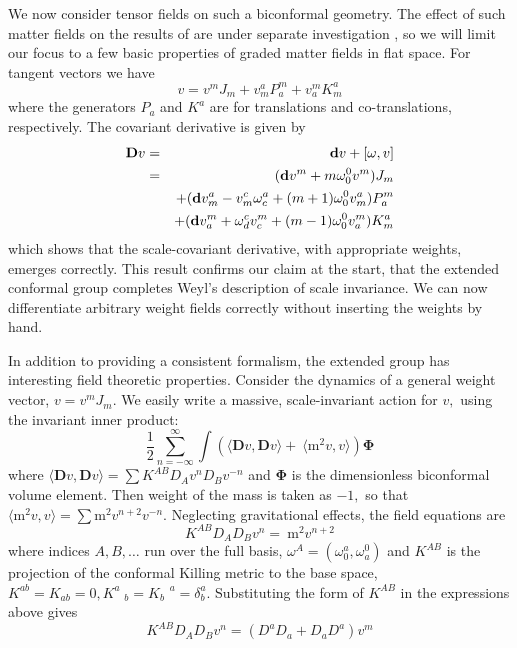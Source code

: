 \documentclass[a4paper,12pt]{article}
\begin{document}
We now consider tensor fields on such a biconformal geometry. The effect of
such matter fields on the results of \cite{WWI} are under separate
investigation \cite{WWIII}, so we will limit our focus to a few basic
properties of graded matter fields in flat space. For tangent vectors we
have 
\begin{equation}
v=v^{m}J_{m}+v_{m}^{a}P_{a}^{m}+v_{a}^{m}K_{m}^{a}
\end{equation}
where the generators $P_{a}$ and $K^{a}$ are for translations and
co-translations, respectively. The covariant derivative is given by 
\begin{eqnarray}
\mathbf{D}v &=&\mathbf{d}v+[\mathbf{\omega },v] \\
&=&(\mathbf{d}v^{m}+m\mathbf{\omega }_{0}^{0}v^{m})J_{m} \\
&&+(\mathbf{d}v_{m}^{a}-v_{m}^{c}\mathbf{\omega }_{c}^{a}+(m+1)\mathbf{%
\omega }_{0}^{0}v_{m}^{a})P_{a}^{m} \\
&&+(\mathbf{d}v_{a}^{m}+\mathbf{\omega }_{d}^{c}v_{c}^{m}+(m-1)\mathbf{%
\omega }_{0}^{0}v_{a}^{m})K_{m}^{a}
\end{eqnarray}
which shows that the scale-covariant derivative, with appropriate weights,
emerges correctly. This result confirms our claim at the start, that the
extended conformal group completes Weyl's description of scale invariance.
We can now differentiate arbitrary weight fields correctly without inserting
the weights by hand.

In addition to providing a consistent formalism, the extended group has interesting field theoretic properties. Consider the dynamics of a general weight vector, $v=v^{m}J_{m}.$ We easily write a massive, scale-invariant action for $v,$ using the invariant inner product: 
\begin{equation}
\frac{1}{2}\sum_{n=-\infty }^{\infty }\int (\langle \mathbf{D}v,\mathbf{D}%
v\rangle +\ \langle \mathrm{m}^{2}v,v\rangle )\mathbf{\Phi }
\end{equation}
where $\langle \mathbf{D}v,\mathbf{D}v\rangle =\sum
K^{AB}D_{A}v^{n}D_{B}v^{-n}$ and $\mathbf{\Phi }$ is the dimensionless
biconformal volume element. Then weight of the mass is taken as $-1,$ so
that $\langle \mathrm{m}^{2}v,v\rangle =\sum \mathrm{m}^{2}v^{n+2}v^{-n}.$
Neglecting gravitational effects, the field equations are 
\begin{equation}
K^{AB}D_{A}D_{B}v^{n}=\ \mathrm{m}^{2}v^{n+2}  \label{Vert field eq.}
\end{equation}
where indices $A,B,\ldots $ run over the full basis, $\omega ^{A}=(\omega
_{0}^{a},\omega _{a}^{0})$ and $K^{AB}$ is the projection of the conformal
Killing metric to the base space, $K^{ab}=K_{ab}=0,K_{\quad b}^{a}=K_{b}^{\quad a}=\delta_{b}^{a}$. Substituting the form of $K^{AB}$ in the
expressions above gives 
\begin{equation}
K^{AB}D_{A}D_{B}v^{n}=(D^{a}D_{a}+D_{a}D^{a})v^{m}
\end{equation}
\end{document}
